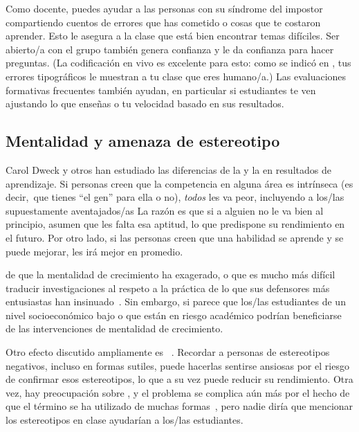 Como docente,
puedes ayudar a las personas con su síndrome del impostor
compartiendo cuentos de errores que has cometido o cosas que te costaron aprender.
Esto le asegura a la clase que está bien encontrar temas difíciles.
Ser abierto/a con el grupo también genera confianza
y le da confianza para hacer preguntas.
(La codificación en vivo es excelente para esto:
como se indicó en ,
tus errores tipográficos le muestran a tu clase que eres humano/a.)
Las evaluaciones formativas frecuentes también ayudan,
en particular si estudiantes te ven ajustando lo que enseñas o tu velocidad
basado en sus resultados.

\subsection*{Mentalidad y amenaza de estereotipo}

Carol Dweck y otros
han estudiado las diferencias de la 
y la  en resultados de aprendizaje.
Si personas creen que la competencia en alguna área es intrínseca
(es decir,\ que tienes ``el gen'' para ella o no),
\emph{todos} les va peor,
incluyendo a los/las supuestamente aventajados/as
La razón es que si a alguien no le va bien al principio,
asumen que les falta esa aptitud,
lo que predispone su rendimiento en el futuro.
Por otro lado,
si las personas creen que una habilidad se aprende y se puede mejorar,
les irá mejor en promedio.

de que la mentalidad de crecimiento ha exagerado,
o que es mucho más difícil traducir investigaciones al respeto a la práctica
de lo que sus defensores más entusiastas han insinuado~\cite{Sisk2018}.
Sin embargo,
si parece que los/las estudiantes de un nivel socioeconómico bajo o que están en riesgo académico podrían beneficiarse de las intervenciones de mentalidad de crecimiento.

Otro efecto discutido ampliamente es ~\cite{Stee2011}.
Recordar a personas de estereotipos negativos,
incluso en formas sutiles,
puede hacerlas sentirse ansiosas por el riesgo de confirmar esos estereotipos,
lo que a su vez puede reducir su rendimiento.
Otra vez,
hay preocupación sobre
,
y el problema se complica aún más por el hecho de que el término se ha utilizado de muchas formas~\cite{Shap2007},
pero nadie diría que mencionar los estereotipos en clase ayudarían a los/las estudiantes.

